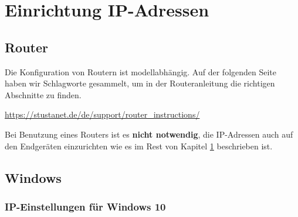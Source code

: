 \documentclass[a4paper,12pt]{scrartcl}
\begin{document}
\pagebreak

\section{Einrichtung IP-Adressen}
\label{section_netzweradresse}
\subsection{Router}

Die Konfiguration von Routern ist modellabhängig.
Auf der folgenden Seite haben wir Schlagworte gesammelt, um in der Routeranleitung die richtigen Abschnitte zu finden.

\url{https://stustanet.de/de/support/router_instructions/}

Bei Benutzung eines Routers ist es \textbf{nicht notwendig}, die IP-Adressen auch auf den Endgeräten einzurichten wie es im Rest von Kapitel \ref{section_netzweradresse} beschrieben ist.

\subsection{Windows}

\subsubsection*{IP-Einstellungen für Windows 10}
\end{document}
